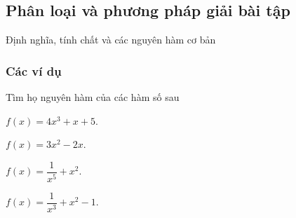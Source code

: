 \subsection{Phân loại và phương pháp giải bài tập}
\begin{dang}{Định nghĩa, tính chất và các nguyên hàm cơ bản}
\end{dang}
\subsubsection{Các ví dụ}
\begin{vd}%
	Tìm họ nguyên hàm của các hàm số sau
    \begin{listEX}[2]
        \item $f(x)=4x^3+x+5$.
        \item $f(x)=3x^2-2x$.
        \item $f(x)=\dfrac{1}{x^5}+x^2$.
        \item $f(x)=\dfrac{1}{x^3}+x^2-1$.
    \end{listEX}
    \end{vd}
